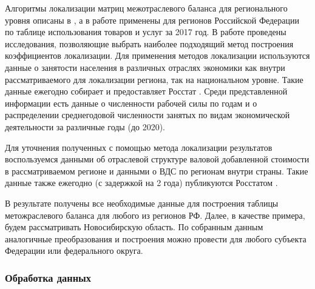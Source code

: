 \documentclass[12pt, a4paper]{article}
\begin{document}
Алгоритмы локализации матриц межотраслевого баланса для регионального уровня описаны в \cite{Flegg}, а в работе \cite{PonomEvdok} применены для регионов Российской Федерации по таблице использования товаров и услуг за 2017 год. В работе \cite{Kronenberg} 
 проведены исследования, позволяющие выбрать наиболее подходящий метод построения коэффициентов локализации. Для применения методов локализации используются данные о занятости населения в различных отраслях экономики как внутри рассматриваемого для локализации региона, так на национальном уровне. Такие данные ежегодно собирает и предоставляет Росстат \cite{RegionStat}. 
 Среди представленной информации есть данные о численности рабочей силы по годам и о распределении среднегодовой численности занятых по видам экономической деятельности за различные годы (до 2020).

Для уточнения полученных с помощью метода локализации результатов воспользуемся данными об отраслевой структуре валовой добавленной стоимости в рассматриваемом регионе и данными о ВДС по регионам внутри страны. Такие данные также ежегодно (с задержкой на 2 года) публикуются Росстатом \cite{RegionStat}.

В результате получены все необходимые данные для построения таблицы метожраслевого баланса для любого из регионов РФ. Далее, в качестве примера, будем рассматривать Новосибирскую область. По собранным данным аналогичные преобразования и построения можно провести для любого субъекта Федерации или федерального округа.

\subsubsection{Обработка данных}
\end{document}
